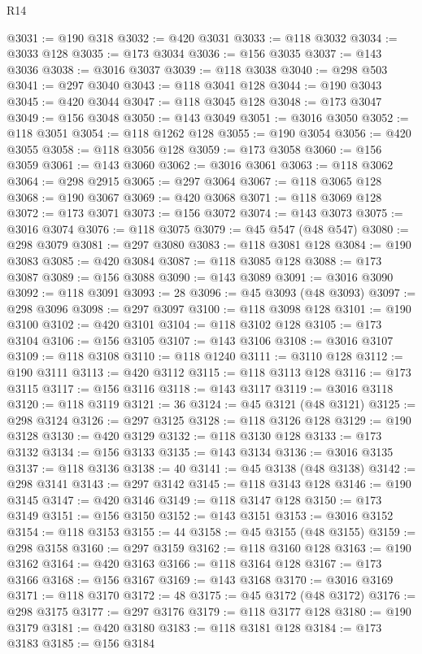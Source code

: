 \begin{lexlean}{R14}
\begin{coremodule}
@3031 := @190 @318
@3032 := @420 @3031
@3033 := @118 @3032
@3034 := @3033 @128
@3035 := @173 @3034
@3036 := @156 @3035
@3037 := @143 @3036
@3038 := @3016 @3037
@3039 := @118 @3038
@3040 := @298 @503
@3041 := @297 @3040
@3043 := @118 @3041 @128
@3044 := @190 @3043
@3045 := @420 @3044
@3047 := @118 @3045 @128
@3048 := @173 @3047
@3049 := @156 @3048
@3050 := @143 @3049
@3051 := @3016 @3050
@3052 := @118 @3051
@3054 := @118 @1262 @128
@3055 := @190 @3054
@3056 := @420 @3055
@3058 := @118 @3056 @128
@3059 := @173 @3058
@3060 := @156 @3059
@3061 := @143 @3060
@3062 := @3016 @3061
@3063 := @118 @3062
@3064 := @298 @2915
@3065 := @297 @3064
@3067 := @118 @3065 @128
@3068 := @190 @3067
@3069 := @420 @3068
@3071 := @118 @3069 @128
@3072 := @173 @3071
@3073 := @156 @3072
@3074 := @143 @3073
@3075 := @3016 @3074
@3076 := @118 @3075
@3079 := @45 @547 (@48 @547)
@3080 := @298 @3079
@3081 := @297 @3080
@3083 := @118 @3081 @128
@3084 := @190 @3083
@3085 := @420 @3084
@3087 := @118 @3085 @128
@3088 := @173 @3087
@3089 := @156 @3088
@3090 := @143 @3089
@3091 := @3016 @3090
@3092 := @118 @3091
@3093 := 28
@3096 := @45 @3093 (@48 @3093)
@3097 := @298 @3096
@3098 := @297 @3097
@3100 := @118 @3098 @128
@3101 := @190 @3100
@3102 := @420 @3101
@3104 := @118 @3102 @128
@3105 := @173 @3104
@3106 := @156 @3105
@3107 := @143 @3106
@3108 := @3016 @3107
@3109 := @118 @3108
@3110 := @118 @1240
@3111 := @3110 @128
@3112 := @190 @3111
@3113 := @420 @3112
@3115 := @118 @3113 @128
@3116 := @173 @3115
@3117 := @156 @3116
@3118 := @143 @3117
@3119 := @3016 @3118
@3120 := @118 @3119
@3121 := 36
@3124 := @45 @3121 (@48 @3121)
@3125 := @298 @3124
@3126 := @297 @3125
@3128 := @118 @3126 @128
@3129 := @190 @3128
@3130 := @420 @3129
@3132 := @118 @3130 @128
@3133 := @173 @3132
@3134 := @156 @3133
@3135 := @143 @3134
@3136 := @3016 @3135
@3137 := @118 @3136
@3138 := 40
@3141 := @45 @3138 (@48 @3138)
@3142 := @298 @3141
@3143 := @297 @3142
@3145 := @118 @3143 @128
@3146 := @190 @3145
@3147 := @420 @3146
@3149 := @118 @3147 @128
@3150 := @173 @3149
@3151 := @156 @3150
@3152 := @143 @3151
@3153 := @3016 @3152
@3154 := @118 @3153
@3155 := 44
@3158 := @45 @3155 (@48 @3155)
@3159 := @298 @3158
@3160 := @297 @3159
@3162 := @118 @3160 @128
@3163 := @190 @3162
@3164 := @420 @3163
@3166 := @118 @3164 @128
@3167 := @173 @3166
@3168 := @156 @3167
@3169 := @143 @3168
@3170 := @3016 @3169
@3171 := @118 @3170
@3172 := 48
@3175 := @45 @3172 (@48 @3172)
@3176 := @298 @3175
@3177 := @297 @3176
@3179 := @118 @3177 @128
@3180 := @190 @3179
@3181 := @420 @3180
@3183 := @118 @3181 @128
@3184 := @173 @3183
@3185 := @156 @3184

\end{coremodule}
\end{lexlean}
